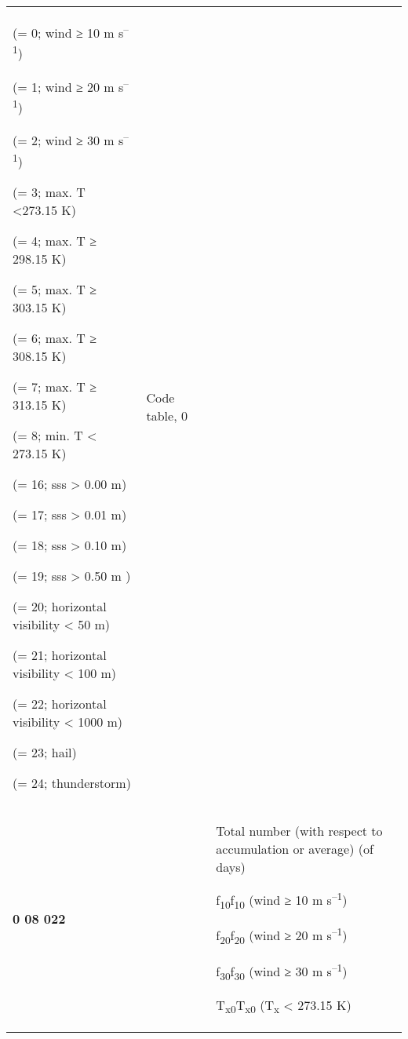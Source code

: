 \begin{longtable}[]{@{}lllll@{}}
\begin{minipage}[t]{0.17\columnwidth}
(= 0; wind ≥ 10 m s\textsuperscript{--1})

(= 1; wind ≥ 20 m s\textsuperscript{--1})

(= 2; wind ≥ 30 m s\textsuperscript{--1})

(= 3; max. T \textless273.15 K)

(= 4; max. T ≥ 298.15 K)

(= 5; max. T ≥ 303.15 K)

(= 6; max. T ≥ 308.15 K)

(= 7; max. T ≥ 313.15 K)

(= 8; min. T \textless{} 273.15 K)

(= 16; sss \textgreater{} 0.00 m)

(= 17; sss \textgreater{} 0.01 m)

(= 18; sss \textgreater{} 0.10 m)

(= 19; sss \textgreater{} 0.50 m )

(= 20; horizontal visibility \textless{} 50 m)

(= 21; horizontal visibility \textless{} 100 m)

(= 22; horizontal visibility \textless{} 1000 m)

(= 23; hail)

(= 24; thunderstorm)\strut
\end{minipage} & \begin{minipage}[t]{0.17\columnwidth}\raggedright
Code table, 0\strut
\end{minipage}\tabularnewline
\begin{minipage}[t]{0.17\columnwidth}\raggedright
\textbf{0 08 022}\strut
\end{minipage} & \begin{minipage}[t]{0.17\columnwidth}\raggedright
\strut
\end{minipage} & \begin{minipage}[t]{0.17\columnwidth}\raggedright
\strut
\end{minipage} & \begin{minipage}[t]{0.17\columnwidth}\raggedright
Total number (with respect to accumulation or average) (of days)

f\textsubscript{10}f\textsubscript{10} (wind ≥ 10 m s\textsuperscript{--1})

f\textsubscript{20}f\textsubscript{20} (wind ≥ 20 m s\textsuperscript{--1})

f\textsubscript{30}f\textsubscript{30} (wind ≥ 30 m s\textsuperscript{--1})

T\textsubscript{x0}T\textsubscript{x0} (T\textsubscript{x} \textless{} 273.15 K)


\end{minipage}
\end{longtable}
